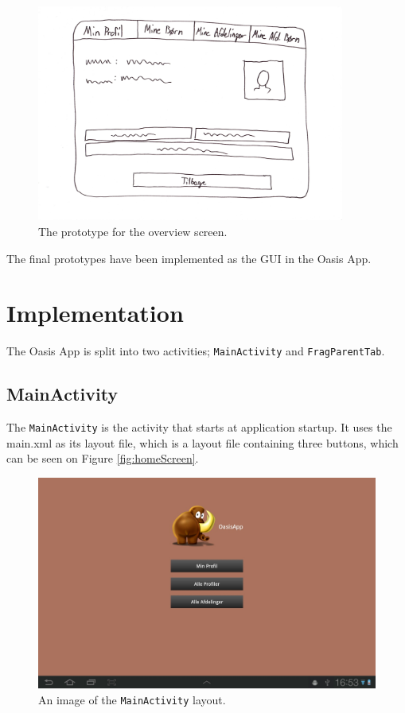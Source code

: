 \begin{figure}[H]
	\centering
		\includegraphics[width=0.9\textwidth]{Images/overviewScreenPrototype}
	\caption{The prototype for the overview screen.}
	\label{fig:overviewScreenProto}
\end{figure}

The final prototypes have been implemented as the GUI in the Oasis App.

\section{Implementation}
\label{sec:AppImp}
The Oasis App is split into two activities; \texttt{MainActivity} and \texttt{FragParentTab}.

\subsection{MainActivity}
The \texttt{MainActivity} is the activity that starts at application startup. It uses the main.xml as its layout file, which is a layout file containing three buttons, which can be seen on Figure \vref{fig:homeScreen}. 

\begin{figure}[H]
	\centering
		\includegraphics[width=\textwidth]{Images/homeScreen}
	\caption{An image of the \texttt{MainActivity} layout.}
	\label{fig:homeScreen}
\end{figure}

